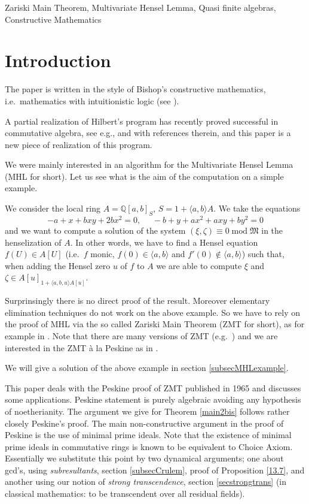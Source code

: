 \documentclass[11pt,a4paper,twoside]{article}
\newcommand \QQ{\mathbb{Q}}
\newcommand{\gothic}{\mathfrak}
\newcommand{\fM}{{\gothic M}}
\newcommand\gen[1]{{\langle #1 \rangle}}
\newcommand{\mod}{\;\mathrm{mod}\;}
\begin{document}
 Zariski Main Theorem, Multivariate Hensel Lemma, Quasi finite algebras, Constructive Mathematics

\tableofcontents

\section{Introduction}

The paper is
written in the style of Bishop's constructive mathematics,
i.e.\ mathematics with intuitionistic logic (see \cite{BB,BR,LQPTF,Richman}).

A partial realization of Hilbert's program has recently proved successful
in commutative algebra, see e.g., \cite{ALP,coq:seminormal,coq:valspace,coq:generating,CQ2012,DLQS,LQPTF,yengui:maximal} and \cite{CLS} with references therein, and this paper is a new piece of realization of this program.

\medskip 
We were mainly interested in an algorithm for the Multivariate Hensel Lemma
(MHL for short).
Let us see what is the aim of the computation on a simple example.

We consider the local ring $A=\QQ[a,b]_S$, $S=1+\gen{a,b}A$.
We take the equations
$$-a + x   + bxy + 2bx^2      = 0,~~~~~~ -b + y +ax^2 + axy + by^2 = 0$$
and we want to compute a solution of the system  $(\xi,\zeta)\equiv 0 \mod \fM$
in the henselization of $A$. In other words, we have to find a Hensel equation $f(U)\in A[U]$ (i.e.\ $f$ monic, $f(0)\in\gen{a,b}$ and $f'(0)\notin\gen{a,b}$) such that, when adding the Hensel zero $u$ of $f$ to $A$
we are able to compute  $\xi$ and $\zeta\in A[u]_{1+\gen{a,b,u}A[u]}$.

Surprinsingly there is no direct proof of the result. Moreover elementary elimination techniques do not work on the above example. So we have to rely on the proof of MHL via the so called Zariski Main Theorem (ZMT for short), as for example in \cite{Ray}.   Note that there are many versions of ZMT
(e.g.\ \cite{EGA4,Zar2}) and we are interested in the ZMT \`a la Peskine as in \cite{Ray}.   

We will give a solution of the above example in section \ref{subsecMHLexample}.



\medskip    This paper deals  with the Peskine proof of ZMT published in 1965  \cite{Peskine}  and discusses some applications.
Peskine statement is purely algebraic avoiding any hypothesis of noetherianity. 
The argument we give for Theorem \ref{main2bis} follows 
rather closely Peskine's proof.
The main non-constructive argument in the proof of Peskine is the use of minimal prime ideals. Note that the existence of minimal prime ideals in commutative rings is known to be equivalent to Choice Axiom. Essentially we substitute this point by two dynamical arguments; one about 
 gcd's, using \emph{subresultants}, section \ref{subsecCrulem}, proof of Proposition \ref{13.7}, and another
 using our  notion of \emph{strong transcendence}, section \ref{secstrongtrans}
(in classical mathematics: to be transcendent over all residual fields). 
\end{document}
